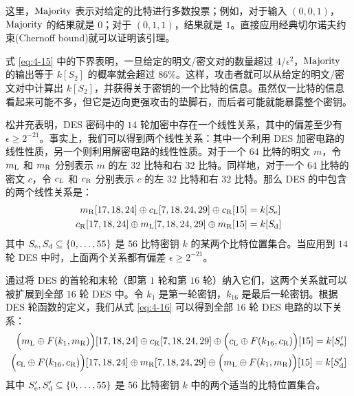 这里，$\rm Majority$ 表示对给定的比特进行多数投票；例如，对于输入 $(0,0,1)$，$\rm Majority$ 的结果就是 $0$；对于 $(0,1,1)$，结果就是 $1$。直接应用经典切尔诺夫约束(Chernoff bound)就可以证明该引理。

式 \ref{eq:4-15} 中的下界表明，一旦给定的明文/密文对的数量超过 ${4}/{\epsilon^2}$，$\rm Majority$ 的输出等于 $k[S_2]$ 的概率就会超过 $86\%$。这样，攻击者就可以从给定的明文/密文对中计算出 $k[S_2]$，并获得关于密钥的一个比特的信息。虽然仅一比特的信息看起来可能不多，但它是迈向更强攻击的垫脚石，而后者可能就能暴露整个密钥。

\begin{snote}
松井充表明，DES 密码中的 $14$ 轮加密中存在一个线性关系，其中的偏差至少有 $\epsilon\geq2^{-21}$。事实上，我们可以得到两个线性关系：其中一个利用 DES 加密电路的线性性质，另一个则利用解密电路的线性性质。对于一个 $64$ 比特的明文 $m$，令 $m_{\rm L}$ 和 $m_{\rm R}$ 分别表示 $m$ 的左 $32$ 比特和右 $32$ 比特。同样地，对于一个 $64$ 比特的密文 $c$，令 $c_{\rm L}$ 和 $c_{\rm R}$ 分别表示 $c$ 的左 $32$ 比特和右 $32$ 比特。那么 DES 的中包含的两个线性关系是：
\begin{equation}\label{eq:4-16}
	\begin{aligned}
		m_{\rm R}[17,18,24]\oplus c_{\rm L}[7,18,24,29]\oplus c_{\rm R}[15] & = k[S_{\rm e}]\\
		c_{\rm R}[17,18,24]\oplus m_{\rm L}[7,18,24,29]\oplus m_{\rm R}[15] & = k[S_{\rm d}]
	\end{aligned}
\end{equation}
其中 $S_{\rm e},S_{\rm d}\subseteq\{0,\dots,55\}$ 是 $56$ 比特密钥 $k$ 的某两个比特位置集合。当应用到 $14$ 轮 DES 中时，上面两个关系都有偏差 $\epsilon\geq2^{-21}$。

通过将 DES 的首轮和末轮（即第 $1$ 轮和第 $16$ 轮）纳入它们，这两个关系就可以被扩展到全部 $16$ 轮 DES 中。令 $k_1$ 是第一轮密钥，$k_{16}$ 是最后一轮密钥。根据 DES 轮函数的定义，我们从式 \ref{eq:4-16} 可以得到全部 $16$ 轮 DES 电路的以下关系：
\begin{align}
\Big(m_{\rm L}\oplus F(k_1,m_{\rm R})\Big)[17,18,24]\oplus c_{\rm R}[7,18,24,29]\oplus\Big(c_{\rm L}\oplus F(k_{16},c_{\rm R})\Big)[15]=k[S_{\rm e}'] \label{eq:4-17}\\
\Big(c_{\rm L}\oplus F(k_{16},c_{\rm R})\Big)[17,18,24]\oplus m_{\rm R}[7,18,24,29]\oplus\Big(m_{\rm L}\oplus F(k_1,m_{\rm R})\Big)[15]=k[S_{\rm d}'] \label{eq:4-18}
\end{align}
其中 $S_{\rm e}',S_{\rm d}'\subseteq\{0,\dots,55\}$ 是 $56$ 比特密钥 $k$ 中的两个适当的比特位置集合。


\end{snote}
